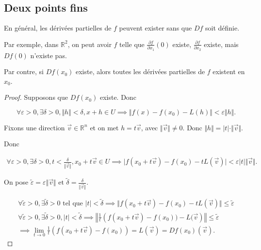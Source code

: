\documentclass[french]{article}
\theoremstyle{definition}
\theoremstyle{remark}
\newcommand{\lesss}{<}
\newcommand{\less}{\lesss}
\newcommand{\biggg}{>}
\newcommand{\bg}{\biggg}
\begin{document}
\subsection{Deux points fins}

En général, les dérivées partielles de $f$ peuvent exister sans que $Df$ soit définie.

Par exemple, dans $\mathbb{R}^2$, on peut avoir $f$ telle que $\frac{\partial f }{\partial x_1 }(0) $ existe, $\frac{\partial f }{\partial x_2 } $ existe, mais $Df(0)$ n'existe pas.

Par contre, si $Df(x_0)$ existe, alors toutes les dérivées partielles de $f$ existent en $x_0$.

\begin{proof}
  Supposons que $Df(x_0)$ existe. Donc

  $$ \forall \varepsilon \bg 0, \exists \delta \bg 0, \Vert h \Vert \less \delta , x+h \in U  \implies \Vert f(x) -f(x_0) - L(h) \Vert \less \varepsilon \Vert h \Vert . $$

  Fixons une direction $\overrightarrow{ v } \in \mathbb{R}^n$ et on met $h = t \overrightarrow{ v } $, avec $\Vert \overrightarrow{ v }  \Vert \neq 0$. Donc $\Vert h \Vert = \lvert t \rvert \cdot \Vert \overrightarrow{ v }  \Vert  $.

  Donc

  \begin{gather*}
    \forall \varepsilon \bg 0, \exists \delta  \bg 0, t \less \frac{\delta }{\Vert \overrightarrow{ v }  \Vert}, x_0 + t \overrightarrow{ v }  \in U \implies \lvert f(x_0+t \overrightarrow{ v } )-f(x_0)-tL(\overrightarrow{ v } ) \rvert \less \varepsilon \lvert t \rvert \Vert \overrightarrow{ v }  \Vert .
  \end{gather*}

  On pose $\tilde{\varepsilon } = \varepsilon  \Vert \overrightarrow{ v }  \Vert \text{ et }  \tilde{\delta } = \frac{\delta }{\Vert \overrightarrow{ v }  \Vert } $.

  \begin{gather*}
    \forall \tilde{\varepsilon } \bg 0, \exists \tilde{ \delta } \bg 0 \text{ tel que } \lvert t \rvert \less \tilde{\delta } \implies \Vert f(x_0+t \overrightarrow{ v } ) -f(x_0)-tL(\overrightarrow{ v } ) \Vert   \leq \tilde{\varepsilon } \\
    \forall \tilde{\varepsilon } \bg 0, \exists \tilde{ \delta } \bg 0, \lvert t \rvert \less \tilde{\delta } \implies \left\Vert \frac{1}{t}\left(f(x_0 + t \overrightarrow{ v } ) -f(x_0)) - L(\overrightarrow{ v } \right) \right\Vert \leq \tilde{\varepsilon } \\
    \implies \lim_{t \to 0} \frac{1}{t}\left(f(x_0+t \overrightarrow{ v } )-f(x_0)\right) = L(\overrightarrow{ v } ) = Df(x_0)(\overrightarrow{ v } ) .
  \end{gather*}


\end{proof}
\end{document}
